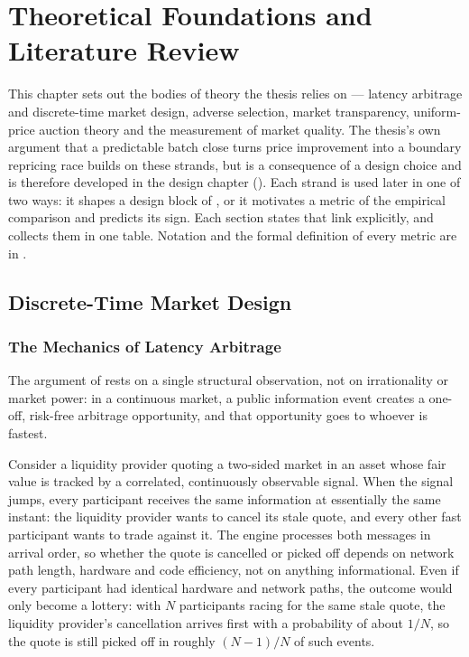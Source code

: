 \chapter{Theoretical Foundations and Literature Review}
\label{ch:foundations}

This chapter sets out the bodies of theory the thesis relies on --- latency
arbitrage and discrete-time market design, adverse selection, market
transparency, uniform-price auction theory and the measurement of market
quality. The thesis's own argument that a predictable batch close turns
price improvement into a boundary repricing race builds on these strands,
but is a consequence of a design choice and is therefore developed in the
design chapter (). Each strand is used later
in one of two ways: it shapes a design block of , or it
motivates a metric of the empirical comparison and predicts its sign. Each
section states that link explicitly, and  collects
them in one table. Notation and the formal definition of every metric are
in .

\section{Discrete-Time Market Design}
\label{sec:discretetime}

\subsection{The Mechanics of Latency Arbitrage}

The argument of \citet{budish2015hft} rests on a single structural
observation, not on irrationality or market power: in a continuous
market, a public information event creates a one-off, risk-free arbitrage
opportunity, and that opportunity goes to whoever is fastest.

Consider a liquidity provider quoting a two-sided market in an asset
whose fair value is tracked by a correlated, continuously observable
signal. When the signal jumps, every participant receives the same
information at essentially the same instant: the liquidity provider wants
to cancel its stale quote, and every other fast participant wants to
trade against it. The engine
processes both messages in arrival order, so whether the quote is
cancelled or picked off depends on network path length, hardware and code
efficiency, not on anything informational. Even if every participant had
identical hardware and network paths, the outcome would only become a
lottery: with $N$ participants racing for the same stale quote, the
liquidity provider's cancellation arrives first with a probability of
about $1/N$, so the quote is still picked off in roughly $(N-1)/N$ of
such events.

